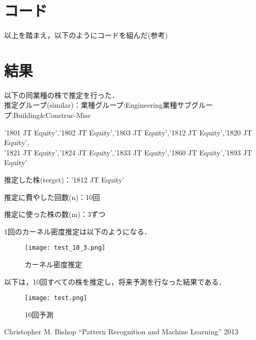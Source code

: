 \documentclass{jsarticle}
\begin{document}
\section{コード}

以上を踏まえ，以下のようにコードを組んだ(参考\cite{GPY})



\section{結果}

以下の同業種の株で推定を行った．\\

推定グループ(similar)：業種グループ:Engineering\quad 業種サブグループ:Building\&Construc-Misc


\begin{center} 
'1801 JT Equity','1802 JT Equity','1803 JT Equity','1812 JT Equity','1820 JT Equity',\\
 '1821 JT Equity','1824 JT Equity','1833 JT Equity','1860 JT Equity','1893 JT Equity'
\end{center}

推定した株(terget)：'1812 JT Equity'

推定に費やした回数(n)：10回

推定に使った株の数(m)：3ずつ

1回のカーネル密度推定は以下のようになる．

\begin{figure}[htb]
 \begin{center}
 \texttt{[image: test\_10\_3.png]}
 \caption{カーネル密度推定}
 \end{center}
\end{figure} 

以下は，10回すべての株を推定し，将来予測を行なった結果である．　

\begin{figure}[htb]
 \begin{center}
 \texttt{[image: test.png]}
 \caption{10回予測}
 \end{center}
\end{figure} 


\begin{thebibliography}{9}
  Christopher M. Bishop ``Pattern Recognition and Machine Learning'' 2013	  
\end{thebibliography}
\end{document}
